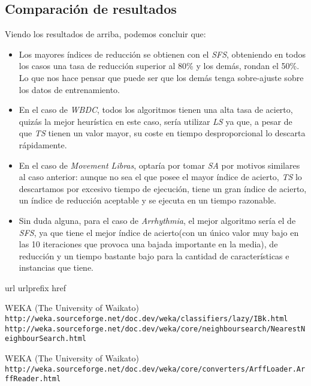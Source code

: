 \documentclass[a4paper, 11pt]{article}
\begin{document}
		\subsection{Comparación de resultados}
			
			
			Viendo los resultados de arriba, podemos concluir que:
			\begin{itemize}
				\item Los mayores índices de reducción se obtienen con el \textit{SFS}, obteniendo en
				todos los casos una tasa de reducción superior al 80\% y los demás, rondan el 50\%.
				Lo que nos hace pensar que puede ser que los demás tenga sobre-ajuste sobre los datos
				de entrenamiento.
				
				\item En el caso de \textit{WBDC}, todos los algoritmos tienen una alta tasa de acierto,
				quizás la mejor heurística en este caso, sería utilizar \textit{LS} ya que, a pesar
				de que \textit{TS} tienen un valor mayor, su coste en tiempo desproporcional lo descarta
				rápidamente.
				
				\item En el caso de \textit{Movement Libras}, optaría por tomar \textit{SA} por motivos
				similares al caso anterior: aunque no sea el que posee el mayor índice de acierto,
				\textit{TS} lo descartamos por excesivo tiempo de ejecución, tiene un gran índice de
				acierto, un índice de reducción aceptable y se ejecuta en un tiempo razonable.

				\item Sin duda alguna, para el caso de \textit{Arrhythmia}, el mejor algoritmo sería
				el de \textit{SFS}, ya que tiene el mejor índice de acierto(con un único valor muy
				bajo en las 10 iteraciones que provoca una bajada importante en la media), de reducción
				y un tiempo bastante bajo para la cantidad de características e instancias que tiene.
			\end{itemize}
		
	\newpage
	
	\begin{thebibliography}{10}
	\expandafter\ifx\csname url\endcsname\relax
	  \def\url#1{\texttt{#1}}\fi
	\expandafter\ifx\csname urlprefix\endcsname\relax\def\urlprefix{URL }\fi
	\expandafter\ifx\csname href\endcsname\relax
	  \def\href#1#2{#2} \def\path#1{#1}\fi
	
	WEKA (The University of Waikato)\\
	  \url{http://weka.sourceforge.net/doc.dev/weka/classifiers/lazy/IBk.html}\\
	  \url{http://weka.sourceforge.net/doc.dev/weka/core/neighboursearch/NearestNeighbourSearch.html}
	  
  	WEKA (The University of Waikato)\\
	  \url{http://weka.sourceforge.net/doc.dev/weka/core/converters/ArffLoader.ArffReader.html}
	  
	\end{thebibliography}
\end{document}
